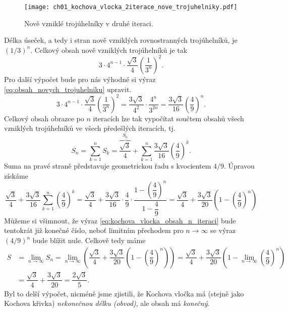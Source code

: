 \begin{figure}[h]
    \centering
    \texttt{[image: ch01\_kochova\_vlocka\_2iterace\_nove\_trojuhelniky.pdf]}
    \caption{Nově vzniklé trojúhelníky v druhé iteraci.}
    \label{fig:kochova_vlocka_2iterace_nove_trojuhelniky}
\end{figure}
Délka úseček, a tedy i stran nově vzniklých rovnostranných trojúhelníků, je $(1/3)^n$. Celkový obsah nově vzniklých trojúhelníků je tak
\begin{equation}\label{eq:obsah_novych_trojuhelniku}
    3\cdot 4^{n-1}\cdot\dfrac{\sqrt{3}}{4}\left(\dfrac{1}{3^n}\right)^2.
\end{equation}
Pro další výpočet bude pro nás výhodné si výraz \eqref{eq:obsah_novych_trojuhelniku} upravit.
\begin{equation*}
    3\cdot 4^{n-1}\cdot\dfrac{\sqrt{3}}{4}\left(\dfrac{1}{3^n}\right)^2=\dfrac{3\sqrt{3}}{4^2}\cdot \dfrac{4^n}{3^{2n}}=\dfrac{3\sqrt{3}}{16}\left(\dfrac{4}{9}\right)^n.
\end{equation*}
Celkový obsah obrazce po $n$ iteracích lze tak vypočítat součtem obsahů všech vzniklých trojúhelníků ve všech předešlých iteracích, tj.
\begin{equation*}
    S_n=\sum_{k=1}^n{S_k}=\overbrace{\dfrac{\sqrt{3}}{4}}^{S_0}+\sum_{k=1}^n{\dfrac{3\sqrt{3}}{16}\left(\dfrac{4}{9}\right)^k}.
\end{equation*}
Suma na pravé straně představuje geometrickou řadu s kvocientem $4/9$. Úpravou získáme
\begin{equation}\label{eq:kochova_vlocka_obsah_n_iteraci}
    \dfrac{\sqrt{3}}{4}+\dfrac{3\sqrt{3}}{16}\sum_{k=1}^n{\left(\dfrac{4}{9}\right)^k}=\dfrac{\sqrt{3}}{4}+\dfrac{3\sqrt{3}}{16}\cdot\dfrac{4}{9}\cdot\dfrac{1-\left(\dfrac{4}{9}\right)^n}{1-\dfrac{4}{9}}=\dfrac{\sqrt{3}}{4}+\dfrac{3\sqrt{3}}{20}\left(1-\left(\dfrac{4}{9}\right)^n\right)
\end{equation}
Můžeme si všimnout, že výraz \eqref{eq:kochova_vlocka_obsah_n_iteraci} bude tentokrát již konečné číslo, neboť limitním přechodem pro $n\to\infty$ se výraz $(4/9)^n$ bude blížit nule. Celkově tedy máme
\begin{align*}
    S&=\lim_{n\to\infty}S_n=\lim_{n\to\infty}\left(\dfrac{\sqrt{3}}{4}+\dfrac{3\sqrt{3}}{20}\left(1-\left(\dfrac{4}{9}\right)^n\right)\right)=\dfrac{\sqrt{3}}{4}+\dfrac{3\sqrt{3}}{20}\left(1-\lim_{n\to\infty}\left(\dfrac{4}{9}\right)^n\right)\\
    &=\dfrac{\sqrt{3}}{4}+\dfrac{3\sqrt{3}}{20}=\dfrac{2\sqrt{3}}{5}.
\end{align*}
Byl to delší výpočet, nicméně jsme zjistili, že Kochova vločka má (stejně jako Kochova křivka) \emph{nekonečnou délku (obvod)}, ale obsah má \emph{konečný}.

